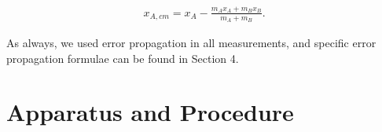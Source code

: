 \documentclass[11pt]{article}
\begin{document}
\begin{align}
x_{A,cm}=x_A-\frac{m_A x_A+ m_B x_B}{m_A + m_B}.
\end{align}

As always, we used error propagation in all measurements, and specific error propagation formulae can be found in Section 4.

\section{Apparatus and Procedure}

\begin{figure}[!h]
   \begin{floatrow}

\end{floatrow}
\end{figure}
\end{document}
